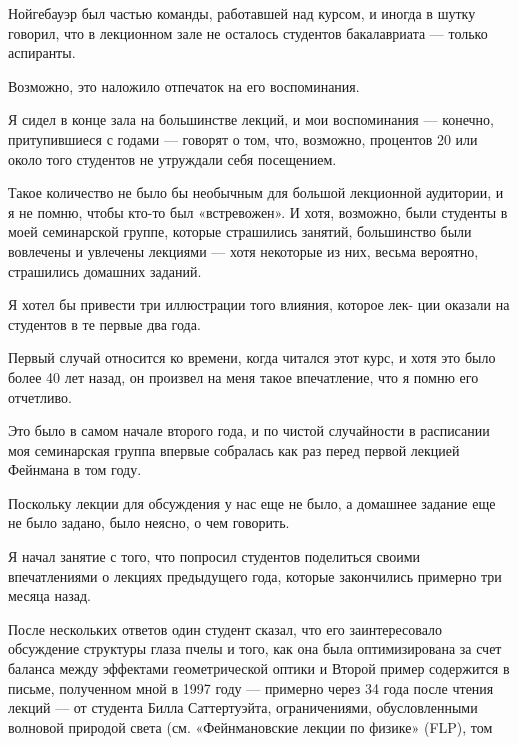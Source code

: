 \documentclass[11pt,oneside]{article}
\begin{document}
Нойгебауэр был частью команды, работавшей над курсом, и иногда в шутку говорил, что в лекционном зале не осталось студентов бакалавриата --- только аспиранты.\par



Возможно, это наложило отпечаток на его воспоминания.\par



Я сидел в конце зала на большинстве лекций, и мои воспоминания --- конечно, притупившиеся с годами --- говорят о том, что, возможно, процентов 20 или около того студентов не утруждали себя посещением.\par



Такое количество не было бы необычным для большой лекционной аудитории, и я не помню, чтобы кто-то был «встревожен». И хотя, возможно, были студенты в моей семинарской группе, которые страшились занятий, большинство были вовлечены и увлечены лекциями --- хотя некоторые из них, весьма вероятно, страшились домашних заданий.\par



Я хотел бы привести три иллюстрации того влияния, которое лек- ции оказали на студентов в те первые два года.\par



Первый случай относится ко времени, когда читался этот курс, и хотя это было более 40 лет назад, он произвел на меня такое впечатление, что я помню его отчетливо.\par



Это было в самом начале второго года, и по чистой случайности в расписании моя семинарская группа впервые собралась как раз перед первой лекцией Фейнмана в том году.\par



Поскольку лекции для обсуждения у нас еще не было, а домашнее задание еще не было задано, было неясно, о чем говорить.\par



Я начал занятие с того, что попросил студентов поделиться своими впечатлениями о лекциях предыдущего года, которые закончились примерно три месяца назад.\par



После нескольких ответов один студент сказал, что его заинтересовало обсуждение структуры глаза пчелы и того, как она была оптимизирована за счет баланса между эффектами геометрической оптики и Второй пример содержится в письме, полученном мной в 1997 году --- примерно через 34 года после чтения лекций --- от студента Билла Саттертуэйта, ограничениями, обусловленными волновой природой света (см. «Фейнмановские лекции по физике» (FLP), том\par
\end{document}
